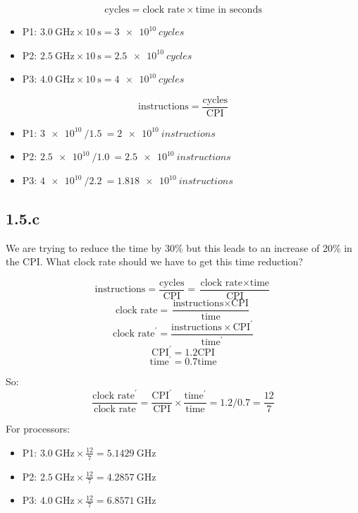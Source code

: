 \documentclass[paper=a4, fontsize=11pt]{scrartcl} %
\begin{document}
$$\text{cycles} = \text{clock rate} \times \text{time in seconds}$$

\begin{itemize}
\item{P1:} $\SI{3.0}{\giga\hertz}\times\SI{10}{\second} = \SI{3e10}{cycles}$
\item{P2:} $\SI{2.5}{\giga\hertz}\times\SI{10}{\second} = \SI{2.5e10}{cycles}$
\item{P3:} $\SI{4.0}{\giga\hertz}\times\SI{10}{\second} = \SI{4e10}{cycles}$
\end{itemize}

$$\text{instructions} = \frac{\text{cycles}}{\text{CPI}}$$

\begin{itemize}
\item{P1:} $\SI{3e10}{} / \SI{1.5}{} = \SI{2e10}{instructions}$
\item{P2:} $\SI{2.5e10}{} / \SI{1.0}{} = \SI{2.5e10}{instructions}$
\item{P3:} $\SI{4e10}{} / \SI{2.2}{} = \SI{1.818e10}{instructions}$
\end{itemize}

\subsection{1.5.c}
\begin{fancyquotes}
  We are trying to reduce the time by 30\% but this leads to an
  increase of 20\% in the CPI\@. What clock rate should we have to get
  this time reduction?
\end{fancyquotes}

$$\text{instructions} = \frac{\text{cycles}}{\text{CPI}}
= \frac{\text{clock rate}\times\text{time}}{\text{CPI}}$$
$$\text{clock rate}
= \frac{\text{instructions}\times\text{CPI}}{\text{time}}$$
$$\text{clock rate}^{\prime}
= \frac{\text{instructions}\times\text{CPI}^{\prime}}{\text{time}^{\prime}}$$
$$\text{CPI}^{\prime} = 1.2\text{CPI}$$
$$\text{time}^{\prime} = 0.7\text{time}$$

So:
$$\frac{\text{clock rate}^{\prime}}{\text{clock rate}}
= \frac{\text{CPI}^{\prime}}{\text{CPI}}\times
\frac{\text{time}^{\prime}}{\text{time}}
= 1.2 / 0.7 = \frac{12}{7}$$

For processors:
\begin{itemize}
\item{P1:} $\SI{3.0}{\giga\hertz}\times\frac{12}{7} =
  \SI{5.1429}{\giga\hertz}$
\item{P2:} $\SI{2.5}{\giga\hertz}\times\frac{12}{7} =
  \SI{4.2857}{\giga\hertz}$
\item{P3:} $\SI{4.0}{\giga\hertz}\times\frac{12}{7} =
  \SI{6.8571}{\giga\hertz}$
\end{itemize}
\end{document}
